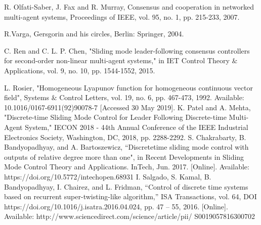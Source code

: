 \begin{thebibliography}{99}
     R. Olfati-Saber, J. Fax and R. Murray, Consensus and cooperation in networked multi-agent systems, Proceedings of IEEE, vol. 95, no. 1, pp.
     215-233, 2007.
    
     
     R.Varga, Gersgorin and his circles, Berlin: Springer, 2004.
     
     
      C. Ren and C. L. P. Chen, "Sliding mode leader-following consensus controllers for second-order non-linear multi-agent systems," in IET Control Theory $\&$ Applications, vol. 9, no. 10, pp. 1544-1552, 2015.
     
     
     L. Rosier, "Homogeneous Lyapunov function for homogeneous continuous vector field", Systems $\&$ Control Letters, vol. 19, no. 6, pp. 467-473, 1992. Available: 10.1016/0167-6911(92)90078-7 [Accessed 30 May 2019].
    K. Patel and A. Mehta, "Discrete-time Sliding Mode Control for Leader Following Discrete-time Multi-Agent System," IECON 2018 - 44th Annual Conference of the IEEE Industrial Electronics Society, Washington, DC, 2018, pp. 2288-2292.
    S. Chakrabarty, B. Bandyopadhyay, and A. Bartoszewicz, ``Discretetime
    sliding mode control with outputs of relative degree more
    than one", in Recent Developments in Sliding Mode Control
    Theory and Applications. InTech, Jun. 2017. [Online]. Available:
    https://doi.org/10.5772/intechopen.68931
    I. Salgado, S. Kamal, B. Bandyopadhyay, I. Chairez, and
    L. Fridman, “Control of discrete time systems based on
    recurrent super-twisting-like algorithm,” ISA Transactions, vol. 64,
    DOI https://doi.org/10.1016/j.isatra.2016.04.024, pp. 47 – 55, 2016.
    [Online]. Available: http://www.sciencedirect.com/science/article/pii/
    S0019057816300702
    
     
     
     
     
     
     
     

\end{thebibliography}
